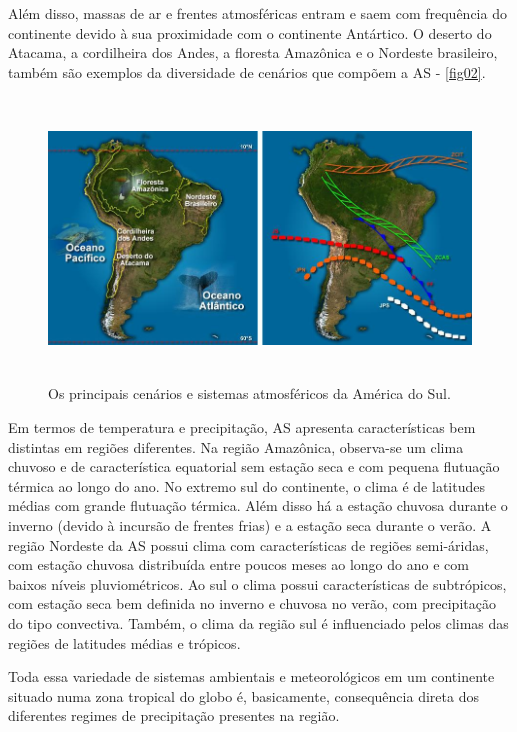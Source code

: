 Além disso, massas de ar e frentes atmosféricas entram e saem com frequência do continente devido à sua proximidade com o continente Antártico. O deserto do Atacama, a cordilheira dos Andes, a floresta Amazônica e o Nordeste brasileiro, também são exemplos da diversidade de cenários que compõem a AS - \autoref{fig02}.

\begin{figure}
\centering
\includegraphics[height=7.5cm]{./figs/fig02.png}
\caption{Os principais cenários e sistemas atmosféricos da América do Sul.}
\label{fig02}
\end{figure}

Em termos de temperatura e precipitação, AS apresenta características bem distintas em regiões diferentes. Na região Amazônica, observa-se um clima chuvoso e de característica equatorial sem estação seca e com pequena flutuação térmica ao longo do ano. No extremo sul do continente, o clima é de latitudes médias com grande flutuação térmica. Além disso há a estação chuvosa durante o inverno (\-de\-vi\-do à incursão de frentes frias) e a estação seca durante o verão. A região Nordeste da AS possui clima com características de regiões semi-áridas, com estação chuvosa distribuída entre poucos meses ao longo do ano e com baixos níveis pluviométricos. Ao sul o clima possui características de subtrópicos, com estação seca bem definida no inverno e chuvosa no verão, com precipitação do tipo convectiva. Também, o clima da região sul é influenciado pelos climas das regiões de latitudes médias e trópicos.

Toda essa variedade de sistemas ambientais e meteorológicos em um continente situado numa zona tropical do globo é, basicamente, consequência direta dos diferentes regimes de precipitação presentes na região. 

